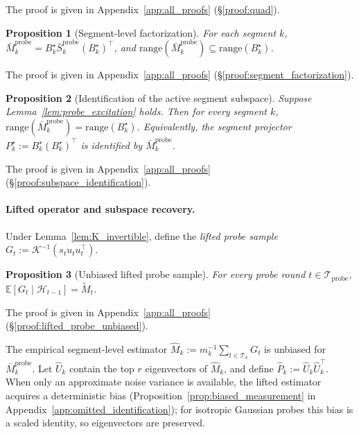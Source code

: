 \documentclass{article}
\newcommand{\E}{\mathbb{E}}
\newcommand{\cH}{\mathcal{H}}
\newcommand{\cT}{\mathcal{T}}
\newcommand{\cTprobe}{\mathcal{T}_{\mathrm{probe}}}
\newcommand{\range}{\mathrm{range}}
\newtheorem{proposition}{Proposition}
\begin{document}
The proof is given in Appendix~\ref{app:all_proofs} (\S\ref{proof:quad}).

\begin{proposition}[Segment-level factorization]
\label{prop:segment_factorization}
For each segment $k$, $\bar M_k^{\mathrm{probe}} = B_k^\star \bar S_k^{\mathrm{probe}} (B_k^\star)^\top$, and $\range(\bar M_k^{\mathrm{probe}})\subseteq \range(B_k^\star)$.
\end{proposition}

The proof is given in Appendix~\ref{app:all_proofs} (\S\ref{proof:segment_factorization}).

\begin{proposition}[Identification of the active segment subspace]
\label{prop:subspace_identification}
Suppose Lemma~\ref{lem:probe_excitation} holds. Then for every segment $k$,
$\range(\bar M_k^{\mathrm{probe}}) = \range(B_k^\star)$.
Equivalently, the segment projector $P_k^\star := B_k^\star (B_k^\star)^\top$ is identified by $\bar M_k^{\mathrm{probe}}$.
\end{proposition}

The proof is given in Appendix~\ref{app:all_proofs} (\S\ref{proof:subspace_identification}).

\paragraph{Lifted operator and subspace recovery.}
Under Lemma~\ref{lem:K_invertible}, define the \emph{lifted probe sample} $G_t := \mathcal K^{-1}(s_t u_tu_t^\top)$.

\begin{proposition}[Unbiased lifted probe sample]
\label{prop:lifted_probe_unbiased}
For every probe round $t\in\cTprobe$,
$\E[G_t \mid \cH_{t-1}] = \widetilde M_t$.
\end{proposition}

The proof is given in Appendix~\ref{app:all_proofs} (\S\ref{proof:lifted_probe_unbiased}).

The empirical segment-level estimator $\widehat M_k := m_k^{-1}\sum_{t\in\cT_k} G_t$ is unbiased for $\bar M_k^{\mathrm{probe}}$.
Let $\widehat U_k$ contain the top $r$ eigenvectors of $\widehat M_k$, and define $\widehat P_k := \widehat U_k \widehat U_k^\top$.
When only an approximate noise variance is available, the lifted estimator acquires a deterministic bias (Proposition~\ref{prop:biased_measurement} in Appendix~\ref{app:omitted_identification}); for isotropic Gaussian probes this bias is a scaled identity, so eigenvectors are preserved.
\end{document}
